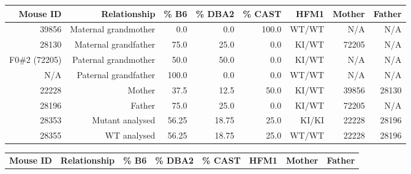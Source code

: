 \begin{table}[p]
	\begin{subtable}[h]{\textwidth}
		
		\centering
		\begin{adjustbox}{width = 1\textwidth}
			\begin{tabular}{rrrrrrrr}

				\toprule
				\textbf{Mouse ID} & \textbf{Relationship} & \textbf{\% B6} & \textbf{\% DBA2} & \textbf{\% CAST} & \textbf{HFM1} & \textbf{Mother} & \textbf{Father} \\

				\midrule
				39856   & Maternal grandmother  & 0.0   & 0.0   & 100.0 & WT/WT & N/A    & N/A \\
				28130   & Maternal grandfather  & 75.0  & 25.0  & 0.0   & KI/WT & 72205 & N/A \\
				F0\#2 (72205)   & Paternal grandmother  & 50.0  & 50.0  & 0.0   & KI/WT & N/A    & N/A \\
				N/A      & Paternal grandfather  & 100.0 & 0.0   & 0.0   & WT/WT & N/A    & N/A \\
				\midrule
				22228   & Mother                & 37.5  & 12.5  & 50.0  & KI/WT & 39856 & 28130 \\
				28196   & Father                & 75.0  & 25.0  & 0.0   & KI/WT & 72205 & N/A \\
				\midrule
				28353   & Mutant analysed       & 56.25 & 18.75 & 25.0  & KI/KI & 22228 & 28196 \\
				28355   & WT analysed           & 56.25 & 18.75 & 25.0  & WT/WT & 22228 & 28196 \\
				\bottomrule

			\end{tabular}
		\end{adjustbox}
\label{tab:ancestry-28353-28355}
	\end{subtable}
	\vspace{2cm}


	\begin{subtable}[h]{\textwidth}

		\centering
		\begin{adjustbox}{width = 1\textwidth}
			\begin{tabular}{rrrrrrrr}

				\toprule
				\textbf{Mouse ID} & \textbf{Relationship} & \textbf{\% B6} & \textbf{\% DBA2} & \textbf{\% CAST} & \textbf{HFM1} & \textbf{Mother} & \textbf{Father} \\


\end{tabular}
\end{adjustbox}
\end{subtable}
\end{table}

